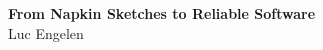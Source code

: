 \newpage
\thispagestyle{empty}

\begin{center}
\Large \textbf{From Napkin Sketches to Reliable Software} \\
\vspace*{0.25cm}
{\Large Luc Engelen}\\
\end{center} 